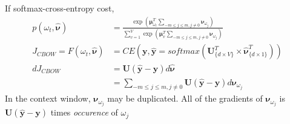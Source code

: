 \documentclass[11pt, oneside]{article}   	%
\begin{document}
If softmax-cross-entropy cost, 
\begin{align}
p(\omega_t, \hat{\bm{\nu}}) &= \frac{\exp(\bm\mu_{\omega_t}^T \sum_{-m\leq j\leq m, j\neq 0}\bm\nu_{\omega_j})}{\sum_{v = 1}^V\exp(\bm\mu_v^T \sum_{-m\leq j\leq m, j\neq 0}\bm\nu_{\omega_j})}\\
J_{CBOW} = F(\omega_t, \hat{\bm{\nu}}) &= CE(\bm{y}, \hat{\bm{y}} = softmax(\bm{U}_{\{d\times V\}}^T \times \hat{\bm{\nu}}_{\{d\times 1\}}^T))\\
d J_{CBOW} &= \bm{U}(\hat{\bm{y}} - \bm{y}) d \hat{\bm{\nu}}\\
&= \sum_{-m\leq j\leq m, j\neq 0} \bm{U}(\hat{\bm{y}} - \bm{y}) d \bm\nu_{\omega_j}
\end{align}
In the context window, $\bm\nu_{\omega_j}$ may be duplicated. All of the gradients of $\bm\nu_{\omega_j}$ is $\bm{U}(\hat{\bm{y}} - \bm{y})$ times \textit{occurence} of $\omega_j$
\end{document}
